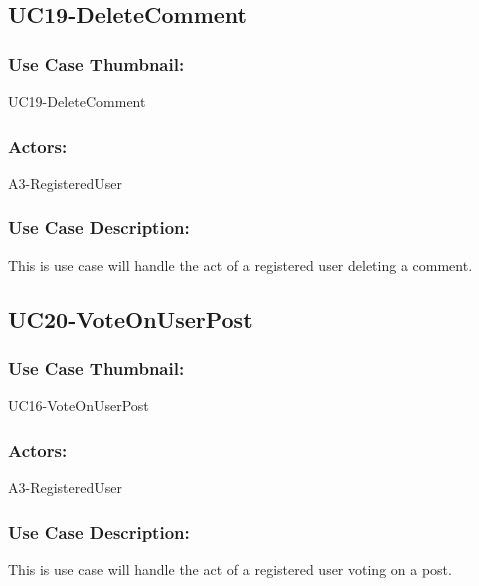 \documentclass[11pt, openany]{report}
\begin{document}
\subsection{UC19-DeleteComment}
\label{sUC19}
\subsubsection*{Use Case Thumbnail:}
UC19-DeleteComment
\subsubsection*{Actors:}
A3-RegisteredUser
\subsubsection*{Use Case Description:}
This is use case will handle the act of a registered user deleting a comment.


\subsection{UC20-VoteOnUserPost}
\label{sUC20}
\subsubsection*{Use Case Thumbnail:}
UC16-VoteOnUserPost
\subsubsection*{Actors:}
A3-RegisteredUser
\subsubsection*{Use Case Description:}
This is use case will handle the act of a registered user voting on a post.
\end{document}
